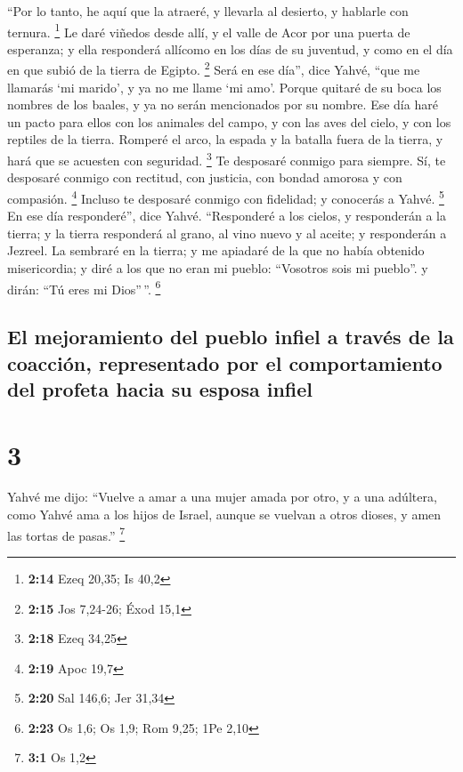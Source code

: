  ``Por lo tanto, he aquí que la atraeré, y llevarla al
desierto, y hablarle con ternura. \footnote{\textbf{2:14} Ezeq 20,35; Is
  40,2}  Le daré viñedos desde allí, y el valle de Acor
por una puerta de esperanza; y ella responderá allícomo en los días de
su juventud, y como en el día en que subió de la tierra de Egipto.
\footnote{\textbf{2:15} Jos 7,24-26; Éxod 15,1}  Será en
ese día'', dice Yahvé, ``que me llamarás `mi marido', y ya no me llame
`mi amo'.  Porque quitaré de su boca los nombres de los
baales, y ya no serán mencionados por su nombre.  Ese día
haré un pacto para ellos con los animales del campo, y con las aves del
cielo, y con los reptiles de la tierra. Romperé el arco, la espada y la
batalla fuera de la tierra, y hará que se acuesten con seguridad.
\footnote{\textbf{2:18} Ezeq 34,25}  Te desposaré conmigo
para siempre. Sí, te desposaré conmigo con rectitud, con justicia, con
bondad amorosa y con compasión. \footnote{\textbf{2:19} Apoc 19,7}
 Incluso te desposaré conmigo con fidelidad; y conocerás
a Yahvé. \footnote{\textbf{2:20} Sal 146,6; Jer 31,34} 
En ese día responderé'', dice Yahvé. ``Responderé a los cielos, y
responderán a la tierra;  y la tierra responderá al
grano, al vino nuevo y al aceite; y responderán a Jezreel.
 La sembraré en la tierra; y me apiadaré de la que no
había obtenido misericordia; y diré a los que no eran mi pueblo:
``Vosotros sois mi pueblo''. y dirán: ``Tú eres mi Dios''\,''.
\footnote{\textbf{2:23} Os 1,6; Os 1,9; Rom 9,25; 1Pe 2,10}

\hypertarget{el-mejoramiento-del-pueblo-infiel-a-travuxe9s-de-la-coacciuxf3n-representado-por-el-comportamiento-del-profeta-hacia-su-esposa-infiel}{%
\subsection{El mejoramiento del pueblo infiel a través de la coacción,
representado por el comportamiento del profeta hacia su esposa
infiel}\label{el-mejoramiento-del-pueblo-infiel-a-travuxe9s-de-la-coacciuxf3n-representado-por-el-comportamiento-del-profeta-hacia-su-esposa-infiel}}

\hypertarget{section-2}{%
\section{3}\label{section-2}}

 Yahvé me dijo: ``Vuelve a amar a una mujer amada por
otro, y a una adúltera, como Yahvé ama a los hijos de Israel, aunque se
vuelvan a otros dioses, y amen las tortas de pasas.'' \footnote{\textbf{3:1}
  Os 1,2}

